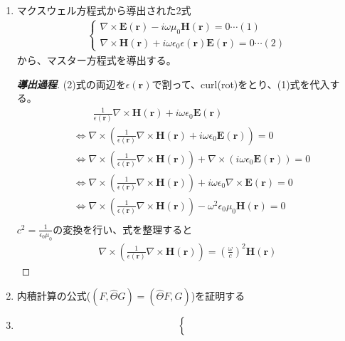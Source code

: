 \documentclass[a4paper,11pt,dvipdfmx]{jsarticle}
\begin{document}
\begin{enumerate}
  \item マクスウェル方程式から導出された2式
  \begin{align*}
    \begin{cases}
      \nabla \times \mathbf{E}(\mathbf{r}) - i \omega \mu_0 \mathbf{H}(\mathbf{r}) = 0 \cdots  (1) \\
      \nabla \times \mathbf{H}(\mathbf{r}) + i \omega \epsilon_0 \epsilon(\mathbf{r})\mathbf{E}(\mathbf{r}) = 0 \cdots (2)
    \end{cases}
  \end{align*}
  から、マスター方程式を導出する。
  \begin{proof}[\textbf{導出過程}]
    (2)式の両辺を$\epsilon(\mathbf{r})$で割って、curl(rot)をとり、(1)式を代入する。
    \begin{align*}
      &\qquad \frac{1}{\epsilon(\mathbf{r})} \nabla \times \mathbf{H(r)} + i \omega \epsilon_0 \mathbf{E(r)}
      \\
      & \Longleftrightarrow \nabla \times  \left( \frac{1}{\epsilon(\mathbf{r})} \nabla \times \mathbf{H(r)} + i \omega \epsilon_0 \mathbf{E(r)} \right) = 0 \\
      & \Longleftrightarrow \nabla \times  \left( \frac{1}{\epsilon(\mathbf{r})} \nabla \times \mathbf{H(r)} \right) + \nabla \times \left( i \omega \epsilon_0 \mathbf{E(r)}  \right)= 0 \\
      & \Longleftrightarrow \nabla \times  \left( \frac{1}{\epsilon(\mathbf{r})} \nabla \times \mathbf{H(r)} \right) + i \omega \epsilon_0 \nabla \times \mathbf{E(r)} = 0 \\
      & \Longleftrightarrow \nabla \times  \left( \frac{1}{\epsilon(\mathbf{r})} \nabla \times \mathbf{H(r)} \right) - \omega^2 \epsilon_0 \mu_0 \mathbf{H(r)} = 0 \\
    \end{align*}
    $\displaystyle c^2 = \frac{1}{\epsilon_0 \mu_0}$の変換を行い、式を整理すると
    \begin{align*}
      \nabla \times  \left( \frac{1}{\epsilon(\mathbf{r})} \nabla \times \mathbf{H(r)} \right) = \left( \frac{\omega}{c} \right)^2 \mathbf{H(r)}
    \end{align*}
  \end{proof}
  \item 内積計算の公式($(F, \hat{\Theta}G) = (\hat{\Theta}F,G)$)を証明する
  \item 
    \begin{align*}
      \begin{cases}
        \displaystyle

\end{cases}
\end{align*}
\end{enumerate}
\end{document}

